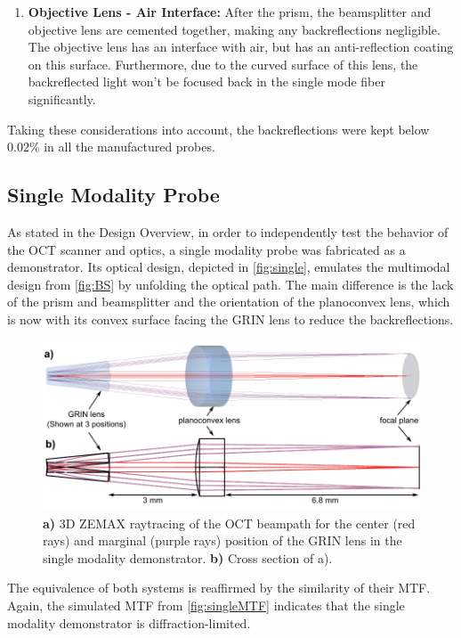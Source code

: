 \begin{enumerate}
\item \textbf{Objective Lens - Air Interface:} After the prism, the beamsplitter and objective lens are cemented together, making any backreflections negligible. The objective lens has an interface with air, but has an anti-reflection coating on this surface. Furthermore, due to the curved surface of this lens, the backreflected light won't be focused back in the single mode fiber significantly.
\end{enumerate}

Taking these considerations into account, the backreflections were kept below 0.02\% in all the manufactured probes.

\subsection{Single Modality Probe}
As stated in the Design Overview, in order to independently test the behavior of the OCT scanner and optics, a single modality probe was fabricated as a demonstrator. Its optical design, depicted in \autoref{fig:single}, emulates the multimodal design from \autoref{fig:BS} by unfolding the optical path. The main difference is the lack of the prism and beamsplitter and the orientation of the planoconvex lens, which is now with its convex surface facing the GRIN lens to reduce the backreflections.

\begin{figure}[h!]\centering
      \includegraphics{figures/30_DesignSimulation/Optical/singleAll.pdf}
      \caption{\textbf{a)} 3D ZEMAX raytracing of the OCT beampath for the center (red rays) and marginal (purple rays) position of the GRIN lens in the single modality demonstrator.
      \textbf{b)} Cross section of a).}
      \label{fig:single}
\end{figure}

The equivalence of both systems is reaffirmed by the similarity of their MTF. Again, the simulated MTF from \autoref{fig:singleMTF} indicates that the single modality demonstrator is diffraction-limited.

